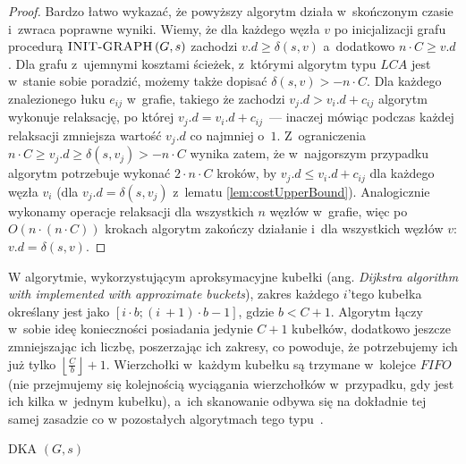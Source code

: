 \begin{proof}

Bardzo łatwo wykazać, że powyższy algorytm działa w~skończonym czasie i~zwraca poprawne wyniki. Wiemy, że dla każdego węzła $v$ po inicjalizacji grafu procedurą $ \textrm{\textsc{INIT-GRAPH}} \left( G, s \right)$ zachodzi $v.d \geqslant \delta \left( s, v \right)$ a~dodatkowo $n \cdot C \geqslant v.d$. Dla grafu z~ujemnymi kosztami ścieżek, z~którymi algorytm typu $LCA$ jest w~stanie sobie poradzić, możemy także dopisać $ \delta \left( s, v \right) > - n \cdot C$. Dla każdego znalezionego łuku $e_{ij}$ w~grafie, takiego że zachodzi $v_{j}.d > v_{i}.d + c_{ij}$ algorytm wykonuje relaksację, po której $v_{j}.d = v_{i}.d + c_{ij}$~--- inaczej mówiąc podczas każdej relaksacji zmniejsza wartość $v_{j}.d$ co najmniej o~$1$. Z~ograniczenia $ n \cdot C \geqslant v_{j}.d \geqslant \delta \left( s, v_{j} \right) > - n \cdot C$ wynika zatem, że w~najgorszym przypadku algorytm potrzebuje wykonać $2 \cdot n \cdot C$ kroków, by $v_{j}.d \leqslant v_{i}.d + c_{ij}$ dla każdego węzła $v_{i}$ (dla $v_{j}.d = \delta \left( s, v_{j} \right)$ z~lematu \ref{lem:costUpperBound}). Analogicznie wykonamy operacje relaksacji dla wszystkich $n$ węzłów w~grafie, więc po $O \left( n \cdot \left( n \cdot C \right) \right) $ krokach algorytm zakończy działanie i~dla wszystkich węzłów $v$: $v.d = \delta \left( s, v \right)$.

\end{proof}

W algorytmie, wykorzystującym aproksymacyjne kubełki (ang. \textit{Dijkstra algorithm with implemented with approximate buckets}), zakres każdego $i$'tego kubełka określany jest jako $ \left[ i \cdot b ; \left( i~+ 1 \right) \cdot b - 1 \right]$, gdzie $b < C + 1$. Algorytm łączy w~sobie ideę konieczności posiadania jedynie $C+1$ kubełków, dodatkowo jeszcze zmniejszając ich liczbę, poszerzając ich zakresy, co powoduje, że potrzebujemy ich już tylko $\left \lfloor \frac{C}{b} \right \rfloor + 1$. Wierzchołki w~każdym kubełku są trzymane w~kolejce $FIFO$ (nie przejmujemy się kolejnością wyciągania wierzchołków w~przypadku, gdy jest ich kilka w~jednym kubełku), a~ich skanowanie odbywa się na dokładnie tej samej zasadzie co w pozostałych algorytmach tego typu~\cite[$23$--$24$]{Dissertation}.

\begin{algorithm}[!htbp]
\DontPrintSemicolon
{}
\caption{ DKA $\left( G, s \right)$\label{alg:AproximateBuckets}}
\end{algorithm}

